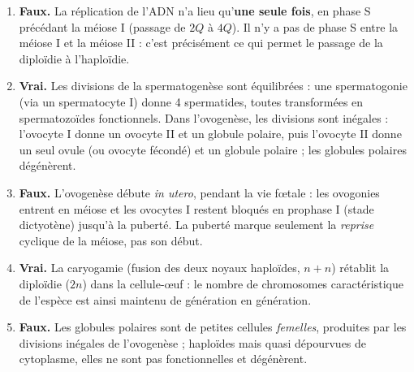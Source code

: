 \documentclass[11pt]{article}
\begin{document}
\begin{corrige}
\begin{enumerate}
\item \textbf{Faux.} La réplication de l'ADN n'a lieu qu'\textbf{une seule fois}, en phase S précédant la méiose I (passage de $2Q$ à $4Q$). Il n'y a pas de phase S entre la méiose I et la méiose II : c'est précisément ce qui permet le passage de la diploïdie à l'haploïdie.
\item \textbf{Vrai.} Les divisions de la spermatogenèse sont équilibrées : une spermatogonie (via un spermatocyte I) donne 4 spermatides, toutes transformées en spermatozoïdes fonctionnels. Dans l'ovogenèse, les divisions sont inégales : l'ovocyte I donne un ovocyte II et un globule polaire, puis l'ovocyte II donne un seul ovule (ou ovocyte fécondé) et un globule polaire ; les globules polaires dégénèrent.
\item \textbf{Faux.} L'ovogenèse débute \emph{in utero}, pendant la vie fœtale : les ovogonies entrent en méiose et les ovocytes I restent bloqués en prophase I (stade dictyotène) jusqu'à la puberté. La puberté marque seulement la \emph{reprise} cyclique de la méiose, pas son début.
\item \textbf{Vrai.} La caryogamie (fusion des deux noyaux haploïdes, $n + n$) rétablit la diploïdie ($2n$) dans la cellule-œuf : le nombre de chromosomes caractéristique de l'espèce est ainsi maintenu de génération en génération.
\item \textbf{Faux.} Les globules polaires sont de petites cellules \emph{femelles}, produites par les divisions inégales de l'ovogenèse ; haploïdes mais quasi dépourvues de cytoplasme, elles ne sont pas fonctionnelles et dégénèrent.
\end{enumerate}
\end{corrige}
\end{document}
